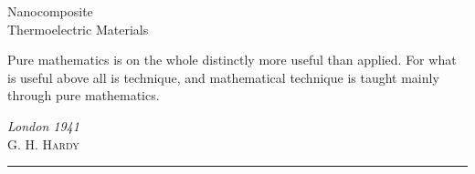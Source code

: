 \begin{titlepage}

\noindent
\titlefont Nanocomposite \\Thermoelectric Materials\par
\epigraph{Pure mathematics is on the whole distinctly more useful than applied. For what is useful above all is technique, and mathematical technique is taught mainly through pure mathematics.}%
{\textit{London 1941}\\ \textsc{G. H. Hardy}}
\null\vfill
\vspace*{1cm}
\noindent
\hfill
\begin{minipage}{0.35\linewidth}
    \begin{flushright}
        \printauthor
    \end{flushright}
\end{minipage}
%
\begin{minipage}{0.02\linewidth}
    \rule{1pt}{125pt}
\end{minipage}
\titlepagedecoration
\end{titlepage}